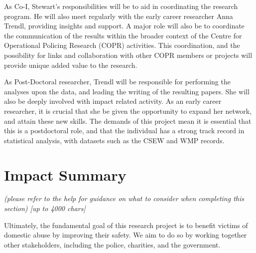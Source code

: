 \documentclass[11pt, a4paper]{article}
\begin{document}
As Co-I, Stewart's responsibilities will be to aid in coordinating the research program. He will also meet regularly with the early career researcher Anna Trendl, providing insights and support. A major role will also be to coordinate the communication of the results within the broader context of the Centre for Operational Policing Research (COPR) activities. This coordination, and the possibility for links and collaboration with other COPR members or projects will provide unique added value to the research. 

As Post-Doctoral researcher, Trendl will be responsible for performing the analyses upon the data, and leading the writing of the resulting papers. She will also be deeply involved with impact related activity. As an early career researcher, it is crucial that she be given the opportunity to expand her network, and attain these new skills. The demands of this project mean it is essential that this is a postdoctoral role, and that the individual has a strong track record in statistical analysis, with datasets such as the CSEW and WMP records. 



\section{Impact Summary }

%
%
%
%
%
%
%
%



\textit{(please refer to the help for guidance on what to consider when completing this section) [up to 4000 chars]}

Ultimately, the fundamental goal of this research project is to benefit victims of domestic abuse by improving their safety. We aim to do so by working together other stakeholders, including the police, charities, and the government.
\end{document}
